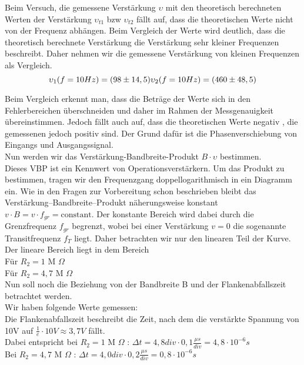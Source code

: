 Beim Versuch, die gemessene Verstärkung $\upsilon$ mit den theoretisch berechneten Werten der Verstärkung  $\upsilon_{t1}$ bzw $\upsilon_{t2}$ fällt auf, dass die theoretischen Werte nicht von der Frequenz abhängen. Beim Vergleich der Werte wird deutlich, dass die theoretisch berechnete Verstärkung die Verstärkung sehr kleiner Frequenzen beschreibt. Daher nehmen wir die gemessene Verstärkung von kleinen Frequenzen als Vergleich. 
\begin{equation}
\upsilon_1(f=10Hz)=(98\pm 14,5)\\
\upsilon_2(f=10Hz)=(460\pm 48,5)
\end{equation}

Beim Vergleich erkennt man, dass die Beträge der Werte sich in den Fehlerbereichen überschneiden und daher im Rahmen der Messgenauigkeit übereinstimmen. Jedoch fällt auch auf, dass die theoretischen Werte negativ , die gemessenen jedoch positiv sind. Der Grund dafür ist die Phasenverschiebung von Eingangs und Ausgangssignal. \\


Nun werden wir das Verstärkung-Bandbreite-Produkt $B\cdot \upsilon$ bestimmen. \\
Dieses VBP ist ein Kennwert von Operationsverstärkern.  Um das Produkt zu bestimmen, tragen wir den Frequenzgang doppellogarithmisch in ein Diagramm ein. Wie in den Fragen zur Vorbereitung schon beschrieben bleibt das Verstärkung–Bandbreite–Produkt  näherungsweise konstant $v\cdot B = v \cdot f_{gr} = \text{constant}$. Der konstante Bereich wird dabei durch die Grenzfrequenz $f_{gr}$ begrenzt, wobei bei einer Verstärkung $v=0$ die sogenannte Transitfrequenz $f_T$ liegt. Daher betrachten wir nur den linearen Teil der Kurve. 
Der lineare Bereich liegt in dem Bereich\\
Für $R_2=1$ M $\Omega$\\
Für $R_2=4,7$ M $\Omega$ \\


Nun soll noch die Beziehung von der Bandbreite B und der Flankenabfallszeit betrachtet werden.\\
Wir haben folgende Werte gemessen:\\
Die Flankenabfallszeit beschreibt die Zeit, nach dem die verstärkte Spannung von 10V auf $\frac{1}{e} \cdot 10V \approx 3,7V$ fällt. \\
Dabei entspricht bei $R_2=1$ M $\Omega$ : $\Delta t =4,8div \cdot 0,1\frac{\mu s}{div}=4,8\cdot10^{-6}s$\\
Bei $R_2=4,7$ M $\Omega$ : $\Delta t =4,0div \cdot 0,2\frac{\mu s}{div}=0,8\cdot10^{-6}s$ 














